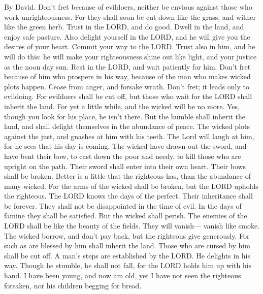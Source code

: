 By David.  Don't fret because of evildoers, neither be
envious against those who work unrighteousness.  For they
shall soon be cut down like the grass, and wither like the green herb.
 Trust in the LORD, and do good. Dwell in the land, and
enjoy safe pasture.  Also delight yourself in the LORD,
and he will give you the desires of your heart.  Commit
your way to the LORD. Trust also in him, and he will do this:
 he will make your righteousness shine out like light, and
your justice as the noon day sun.  Rest in the LORD, and
wait patiently for him. Don't fret because of him who prospers in his
way, because of the man who makes wicked plots happen. 
Cease from anger, and forsake wrath. Don't fret; it leads only to
evildoing.  For evildoers shall be cut off, but those who
wait for the LORD shall inherit the land.  For yet a
little while, and the wicked will be no more. Yes, though you look for
his place, he isn't there.  But the humble shall inherit
the land, and shall delight themselves in the abundance of peace.
 The wicked plots against the just, and gnashes at him
with his teeth.  The Lord will laugh at him, for he sees
that his day is coming.  The wicked have drawn out the
sword, and have bent their bow, to cast down the poor and needy, to kill
those who are upright on the path.  Their sword shall
enter into their own heart. Their bows shall be broken. 
Better is a little that the righteous has, than the abundance of many
wicked.  For the arms of the wicked shall be broken, but
the LORD upholds the righteous.  The LORD knows the days
of the perfect. Their inheritance shall be forever.  They
shall not be disappointed in the time of evil. In the days of famine
they shall be satisfied.  But the wicked shall perish.
The enemies of the LORD shall be like the beauty of the fields. They
will vanish--- vanish like smoke.  The wicked borrow, and
don't pay back, but the righteous give generously.  For
such as are blessed by him shall inherit the land. Those who are cursed
by him shall be cut off.  A man's steps are established
by the LORD. He delights in his way.  Though he stumble,
he shall not fall, for the LORD holds him up with his hand.
 I have been young, and now am old, yet I have not seen
the righteous forsaken, nor his children begging for bread.

